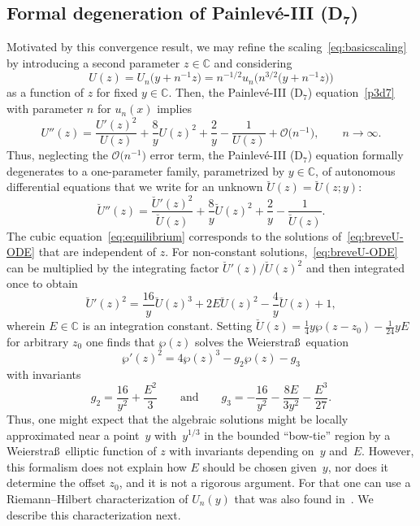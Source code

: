 \documentclass[pdftex]{sigma}
\numberwithin{equation}{section}
\begin{document}
\subsection[Formal degeneration of Painlev\'e-III (D\_7)]{Formal degeneration of Painlev\'e-III (D$\boldsymbol{_7}$)}
\label{sec:scaling}
Motivated by this convergence result, we may refine the scaling~\eqref{eq:basicscaling} by introducing a second parameter $z\in\mathbb{C}$ and considering
\begin{equation}
U(z)=U_n\bigl(y+n^{-1}z\bigr)=n^{-1/2}u_n\bigl(n^{3/2}\bigl(y+n^{-1}z\bigr)\bigr)
\label{eq:U-of-z}
\end{equation}
as a function of $z$ for fixed $y\in\mathbb{C}$. Then, the Painlev\'e-III (D$_7$) equation~\eqref{p3d7} with parameter $n$ for $u_n(x)$ implies
\begin{equation*}
U''(z)=\frac{U'(z)^2}{U(z)}+\frac{8}{y}U(z)^2+\frac{2}{y}-\frac{1}{U(z)} +\mathcal{O}\bigl(n^{-1}\bigr),\qquad n\to\infty.
\end{equation*}
Thus, neglecting the $\mathcal{O}\bigl(n^{-1}\bigr)$ error term, the Painlev\'e-III (D$_7$) equation formally degenerates to a one-parameter family, parametrized by $y\in\mathbb{C}$, of autonomous differential equations that we write for an unknown $\breve{U}(z)=\breve{U}(z;y)$:
\begin{equation}
\breve{U}''(z)=\frac{\breve{U}'(z)^2}{\breve{U}(z)}+\frac{8}{y}\breve{U}(z)^2+\frac{2}{y}-\frac{1}{\breve{U}(z)}.
\label{eq:breveU-ODE}
\end{equation}
The cubic equation~\eqref{eq:equilibrium} corresponds to the solutions of~\eqref{eq:breveU-ODE} that are independent of $z$. For non-constant solutions,~\eqref{eq:breveU-ODE} can be multiplied by the integrating factor $\breve{U}'(z)/\breve{U}(z)^2$ and then integrated once to obtain
\begin{equation}
\breve{U}'(z)^2=\frac{16}{y}\breve{U}(z)^3+2E\breve{U}(z)^2-\frac{4}{y}\breve{U}(z)+1,
\label{eq:breveU-first-order}
\end{equation}
wherein $E\in\mathbb{C}$ is an integration constant. Setting $\breve{U}(z)=\frac{1}{4}y\wp(z-z_0)-\frac{1}{24}yE$ for arbitrary $z_0$ one finds that $\wp(z)$ solves the Weierstra\ss\ equation~\cite[Chapter 23]{DLMF}
\begin{equation}
\wp'(z)^2=4\wp(z)^3-g_2\wp(z)-g_3
\label{eq:Weierstrass}
\end{equation}
with invariants
\begin{equation*}
g_2=\frac{16}{y^2}+\frac{E^2}{3}\qquad\text{and}\qquad
g_3=-\frac{16}{y^2}-\frac{8E}{3y^2}-\frac{E^3}{27}.
\end{equation*}
Thus, one might expect that the algebraic solutions might be locally approximated near a point~$y$ with~$y^{1/3}$ in the bounded ``bow-tie'' region by a Weierstra\ss\ elliptic function of $z$ with invariants depending on~$y$ and~$E$. However, this formalism does not explain how $E$ should be chosen given~$y$, nor does it determine the offset $z_0$, and it is not a rigorous argument. For that one can use a Riemann--Hilbert characterization of $U_n(y)$ that was also found in~\cite{BuckinghamM22}. We describe this characterization next.
\end{document}

